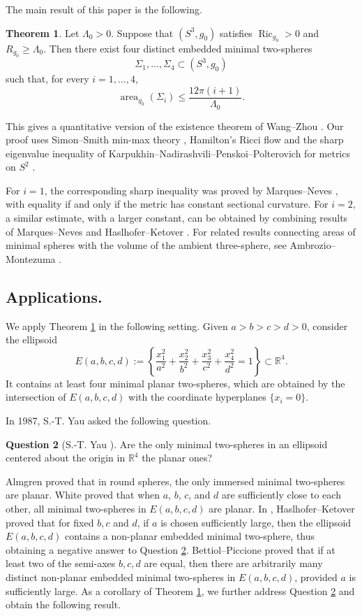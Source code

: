 \documentclass[12pt,english]{amsart}
\theoremstyle{definition}
\newtheorem{theorem}{Theorem}[section]
\newtheorem{question}[theorem]{Question}
\begin{document}
The main result of this paper is the following.

\begin{theorem}
\label{thm:main}
    Let \(\Lambda_0>0\). Suppose that \((S^3,g_0)\) satisfies \(\operatorname{Ric}_{g_0}>0\) and \(R_{g_0}\ge \Lambda_0\). Then there exist four distinct embedded minimal two-spheres
    \[
    \Sigma_1,\ldots,\Sigma_4 \subset (S^3,g_0)
    \]
    such that, for every \(i=1,\ldots,4\),
    \[
    \operatorname{area}_{g_0}(\Sigma_i)\le \frac{12\pi(i+1)}{\Lambda_0}.
    \]
\end{theorem}

This gives a quantitative version of the existence theorem of Wang--Zhou \cite{WZ}. Our proof uses Simon--Smith min-max theory \cite{SS}, Hamilton's Ricci flow \cite{H} and the sharp eigenvalue inequality of Karpukhin--Nadirashvili--Penskoi--Polterovich for metrics on \(S^2\) \cite{KNPP}.

For \(i=1\), the corresponding sharp inequality was proved by Marques--Neves \cite{MN}, with equality if and only if the metric has constant sectional curvature. For \(i=2\), a similar estimate, with a larger constant, can be obtained by combining results of Marques--Neves \cite{MN} and Haslhofer--Ketover \cite{HK}. For related results connecting areas of minimal spheres with the volume of the ambient three-sphere, see Ambrozio--Montezuma \cite{AM}.

\subsection*{Applications.}
We apply Theorem \ref{thm:main} in the following setting. Given $a> b> c> d>0$, consider the ellipsoid
\[
E(a,b,c,d):= \left\{\frac{x_1^2}{a^2}+ \frac{x_2^2}{b^2}+\frac{x_3^2}{c^2}+\frac{x_4^2}{d^2}=1\right\}\subset\mathbb{R}^4.
\]
It contains at least four minimal planar two-spheres, which are obtained by the intersection of $E(a,b,c,d)$ with the coordinate hyperplanes $\{x_i=0\}$.

In 1987, S.-T. Yau asked the following question.

\begin{question}[{S.-T. Yau \cite[Section~4]{Y1}}]
\label{ques:y}
    Are the only minimal two-spheres in an ellipsoid centered about the origin in $\mathbb{R}^4$ the planar ones?
\end{question}

Almgren \cite{A} proved that in round spheres, the only immersed minimal two-spheres are planar.  White \cite{W} proved that when \(a\), \(b\), \(c\), and \(d\) are sufficiently close to each other, all minimal two-spheres in \(E(a,b,c,d)\) are planar. In \cite{HK}, Haslhofer--Ketover proved that for fixed \(b,c\) and \(d\), if \(a\) is chosen sufficiently large, then the ellipsoid \(E(a,b,c,d)\) contains a non-planar embedded minimal two-sphere, thus obtaining a negative answer to Question \ref{ques:y}. Bettiol--Piccione \cite{BP} proved that if at least two of the semi-axes \(b,c,d\) are equal, then there are arbitrarily many distinct non-planar embedded minimal two-spheres in \(E(a,b,c,d)\), provided \(a\) is sufficiently large. As a corollary of Theorem \ref{thm:main}, we further address Question \ref{ques:y} and obtain the following result. 
\end{document}
